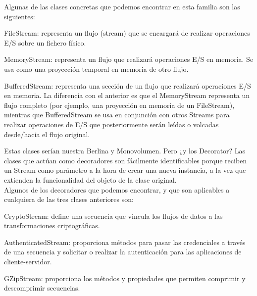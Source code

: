 \begin{flushleft}
Algunas de las clases concretas que podemos encontrar en esta familia son las siguientes:


  \item FileStream: representa un flujo (stream) que se encargará de realizar operaciones E/S sobre un fichero físico.

  \item MemoryStream: representa un flujo que realizará operaciones E/S en memoria. Se usa como una proyección temporal en memoria de otro flujo.

  \item 	BufferedStream: representa una sección de un flujo que realizará operaciones E/S en memoria. La diferencia con el anterior es que el MemoryStream representa un flujo completo (por ejemplo, una proyección en memoria de un FileStream), mientras que BufferedStream se usa en conjunción con otros Streams para realizar operaciones de E/S que posteriormente serán leídas o volcadas desde/hacia el flujo original.

Estas clases serían nuestra Berlina y Monovolumen. Pero ¿y los Decorator? Las clases que actúan como decoradores son fácilmente identificables porque reciben un Stream como parámetro a la hora de crear una nueva instancia, a la vez que extienden la funcionalidad del objeto de la clase original.
\textbf{}\\ 
Algunos de los decoradores que podemos encontrar, y que son aplicables a cualquiera de las tres clases anteriores son:

  \item 	CryptoStream: define una secuencia que vincula los flujos de datos a las transformaciones criptográficas.
  \item 	AuthenticatedStream: proporciona métodos para pasar las credenciales a través de una secuencia y solicitar o realizar la autenticación para las aplicaciones de cliente-servidor.
  \item 	GZipStream: proporciona los métodos y propiedades que permiten comprimir y descomprimir secuencias.


\end{flushleft}
